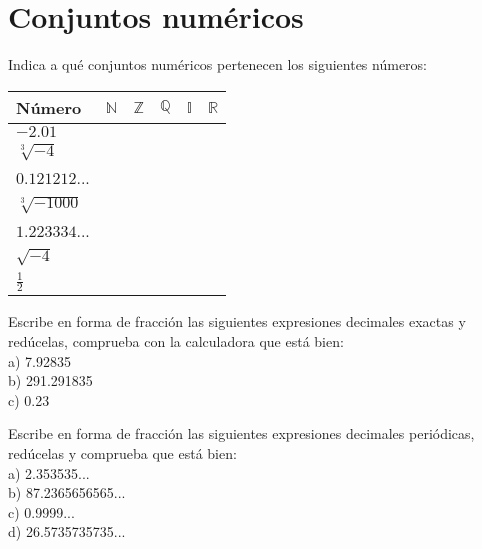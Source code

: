
\section{Conjuntos numéricos}

\begin{ejer}
Indica a qué conjuntos numéricos pertenecen los siguientes números: 


\end{ejer}

\begin{table}[!h]
\begin{center}
\begin{tabularx}{\textwidth}{|X | X | X | X | X | X|} 
 \hline
 \textbf{Número} & \textbf{$\mathbb{N}$} & \textbf{$\mathbb{Z}$} & \textbf{$\mathbb{Q}$} & \textbf{$\mathbb{I}$} & \textbf{$\mathbb{R}$} \\ 
 \hline
 $-2.01$ & & & & & \\
 \hline
  $\sqrt[3]{-4}$ & & & & & \\
 \hline
   $0.121212$... & & & & & \\
 \hline
    $\sqrt[3]{-1000}$ & & & & & \\
 \hline
   $1.223334$... & & & & & \\
 \hline
    $\sqrt{-4}$ & & & & & \\
 \hline
    $\frac{1}{2}$ & & & & & \\
 \hline
\end{tabularx}
\end{center}
\end{table}

\begin{ejer}
Escribe en forma de fracción las siguientes expresiones decimales exactas y redúcelas, comprueba con la calculadora que está bien: \\
a) 7.92835 \\ b) 291.291835 \\ c) 0.23
\end{ejer}

\begin{ejer}
Escribe en forma de fracción las siguientes expresiones decimales periódicas, redúcelas y comprueba que está bien: \\
a) 2.353535... \\ b) 87.2365656565... \\ c) 0.9999... \\ d) 26.5735735735...
\end{ejer}

